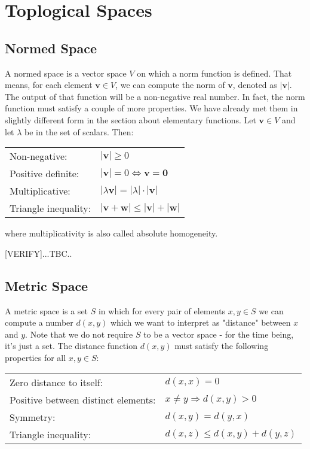 \section{Toplogical Spaces}

\subsection{Normed Space}
A normed space is a vector space $V$ on which a norm function is defined. That means, for each element $\mathbf{v} \in V$, we can compute the norm of $\mathbf{v}$, denoted as $|\mathbf{v}|$. The output of that function will be a non-negative real number. In fact, the norm function must satisfy a couple of more properties. We have already met them in slightly different form in the section about elementary functions. Let $\mathbf{v} \in V$ and let $\lambda$ be in the set of scalars. Then:

\medskip
\begin{tabular}{l l}
Non-negative:         & $|\mathbf{v}| \geq 0$  \\
Positive definite:    & $|\mathbf{v}| = 0 \Leftrightarrow \mathbf{v} = \mathbf{0}$  \\
Multiplicative:       & $|\lambda \mathbf{v}| = |\lambda| \cdot |\mathbf{v}|$  \\
Triangle inequality:  & $|\mathbf{v} + \mathbf{w}| \leq |\mathbf{v}| + |\mathbf{w}| $
\end{tabular}
\medskip

where multiplicativity is also called absolute homogeneity.

[VERIFY]...TBC..



\subsection{Metric Space}
A metric space is a set $S$ in which for every pair of elements $x,y \in S$ we can compute a number $d(x,y)$ which we want to interpret as "distance" between $x$ and $y$. Note that we do not require $S$ to be a vector space - for the time being, it's just a set. The distance function $d(x,y)$ must satisfy the following properties for all $x,y \in S$:

\medskip
\begin{tabular}{l l}
Zero distance to itself:            & $d(x, x) = 0$  \\
Positive between distinct elements: & $x \neq y \Rightarrow d(x,y) > 0$  \\
Symmetry:                           & $d(x, y) = d(y, x)$  \\
Triangle inequality:                & $d(x,z) \leq d(x,y) + d(y,z)$
\end{tabular}
\medskip

